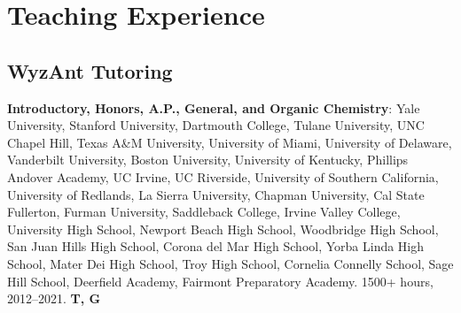 \documentclass[11pt]{article}
\newcommand{\teitem}[4]{\textbf{#1}: #2 #3 \textbf{#4}}
\begin{document}
\section{Teaching Experience}


\vspace*{-2mm}  \vspace*{-2mm}


\subsection{WyzAnt Tutoring}


\teitem{Introductory, Honors, A.P., General, and Organic Chemistry}{Yale University, Stanford University, Dartmouth College, Tulane University, UNC Chapel Hill, Texas A\&M University, University of Miami, University of Delaware, Vanderbilt University, Boston University, University of Kentucky, Phillips Andover Academy, UC Irvine, UC Riverside, University of Southern California, University of Redlands, La Sierra University, Chapman University, Cal State Fullerton, Furman University, Saddleback College, Irvine Valley College, 
University High School, Newport Beach High School, Woodbridge High School, San Juan Hills High School, Corona del Mar High School, Yorba Linda High School, Mater Dei High School, Troy High School, Cornelia Connelly School, Sage Hill School, Deerfield Academy, Fairmont Preparatory Academy.}{1500+ hours, 2012--2021.}{T, G} 
\end{document}
